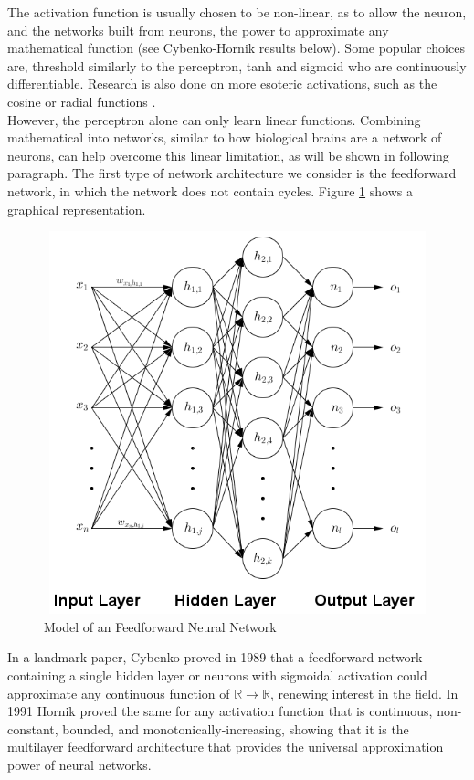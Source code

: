 \documentclass[12pt,oneside]{CUNY_CS_PhD}
\begin{document}
The activation function is usually chosen to be non-linear, as to allow the neuron, and the networks built from neurons, the power to approximate any mathematical function (see Cybenko-Hornik results below).
Some popular choices are, threshold similarly to the perceptron, tanh and sigmoid who 
are continuously differentiable. Research is also done on more esoteric activations, such as the cosine or radial functions \cite{lee_cosine-modulated_1996}.\\
However, the perceptron alone can only learn linear functions.  Combining mathematical into networks, similar to how biological brains are a network of neurons, can help overcome this linear limitation, as will be shown in following paragraph. The first type of network architecture we consider is the feedforward network, in which the  network does not contain cycles. Figure \ref{fig:feedforward} shows a graphical representation.\\
\begin{figure}[!htbp]
\centering
\includegraphics[keepaspectratio=false, height=11.09cm, width=12.5cm]{pictures/FeedForwardNeuralNetwork.png}
\caption{Model of an Feedforward Neural Network}
\label{fig:feedforward}
\end{figure}
\newpage
In a landmark paper, Cybenko \cite{cybenko1989approximation} proved in 1989 that a feedforward network containing a single hidden layer or neurons with sigmoidal activation could approximate any continuous function of $\mathbb{R} \rightarrow \mathbb{R}$, renewing interest in the field. In 1991 Hornik \cite{Hornik:1991} proved the same for any activation function that is continuous, non-constant, bounded, and monotonically-increasing, showing that it is the multilayer feedforward architecture that provides the universal approximation power of neural networks.
\end{document}
